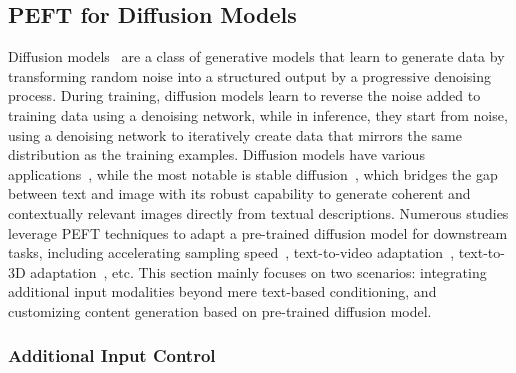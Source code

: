 \subsection{PEFT for Diffusion Models}
\label{peft_on_diffusion}

Diffusion models~\cite{ho2020denoising,sohl2015deep} are a class of generative models that learn to generate data by transforming random noise into a structured output by a progressive denoising process.
During training, diffusion models learn to reverse the noise added to training data using a denoising network, while in inference, they start from noise, using a denoising network to iteratively create data that mirrors the same distribution as the training examples. Diffusion models have various applications~\cite{han2023contrastive,yang2023diffusion,croitoru2023diffusion,dhariwal2021diffusion,ruiz2023dreambooth}, while the most notable is stable diffusion~\cite{rombach2022high}, which bridges the gap between text and image with its robust capability to generate coherent and contextually relevant images directly from textual descriptions. Numerous studies leverage PEFT techniques to adapt a pre-trained diffusion model for downstream tasks, including accelerating sampling speed~\cite{luo2023lcm,chai2023speedupnet}, text-to-video adaptation~\cite{wu2023tune,xing2023simda}, text-to-3D adaptation~\cite{zeng2023ipdreamer}, etc.
This section mainly focuses on two scenarios: integrating additional input modalities beyond mere text-based conditioning, and customizing content generation based on pre-trained diffusion model.



\subsubsection{Additional Input Control}

